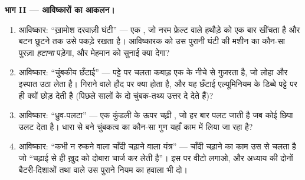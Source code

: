 \begin{problem}[{सप्ताहांत समस्या --- एक बैटरी, तीन प्रभाव, पाँच
आविष्कार; आविष्कारक की कार्यशाला में एक
शाम}]
\medskip\noindent\textbf{भाग II --- आविष्कारों का आकलन।}
\begin{enumerate}[resume]
  \item आविष्कार: ``ख़ामोश दरवाज़ी घंटी'' --- एक , जो
        नरम फ़ेल्ट वाले हथौड़े को एक बार खींचता है और बटन छूटने तक
        उसे पकड़े रखता है। आविष्कारक को उस पुरानी घंटी की मशीन का
        कौन-सा पुरज़ा \emph{हटाना} पड़ेगा, और मेहमान को सुनाई क्या
        देगा?
  \item आविष्कार: ``चुंबकीय छँटाई'' --- पट्टे पर चलता कबाड़ एक
         के नीचे से गुज़रता है, जो लोहा और इस्पात उठा
        लेता है। गिराने वाले हौद पर क्या होता है, और यह छँटाई
        एल्यूमिनियम के डिब्बे पट्टे पर ही क्यों छोड़ देती है (पिछले
        सालों के दो चुंबक-तथ्य उत्तर दे देते हैं)?
  \item आविष्कार: ``ध्रुव-पलटा'' --- एक कुंडली के ऊपर चढ़ी ,
        जो हर बार पलट जाती है जब कोई छिपा   उलट देता है।
        धारा से बने चुंबकत्व का कौन-सा गुण यहाँ काम में लिया जा रहा
        है?
  \item आविष्कार: ``कभी न रुकने वाला चाँदी चढ़ाने वाला यंत्र'' ---
        चाँदी चढ़ाने का काम उस  से चलता है जो ``चढ़ाई से ही
        ख़ुद को दोबारा चार्ज कर लेती है''। इस पर वीटो लगाओ, और अध्याय
        की दोनों बैटरी-दिशाओं तथा  वाले उस पुराने नियम का हवाला
        भी दो।
\end{enumerate}


\end{problem}
